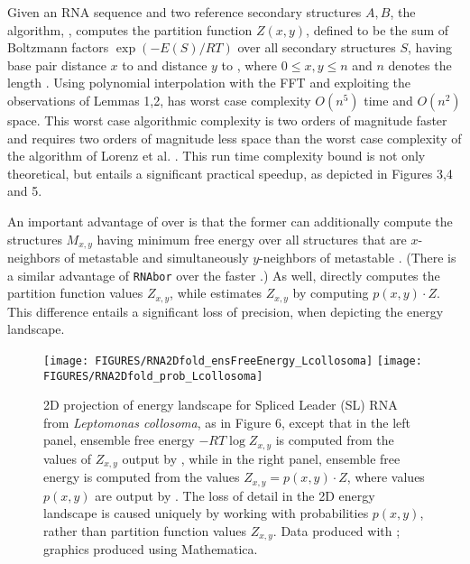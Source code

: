 Given an RNA sequence \seq and two reference secondary structures $A,B$,
the algorithm, \ffttwo, computes the partition
function $Z(x,y)$, defined to be the sum of Boltzmann factors
$\exp(-E(S)/RT)$ over all secondary structures $S$, having base pair
distance $x$ to  \strA and distance $y$ to \strB, where
$0 \leq x,y \leq n$ and $n$ denotes the length \seq.
Using polynomial interpolation with the FFT and exploiting the observations
of Lemmas 1,2, \ffttwo has worst case complexity
$O(n^5)$ time and $O(n^2)$ space. This worst case
algorithmic complexity is two orders of magnitude faster and requires two
orders of magnitude less space than the worst case complexity of the
algorithm \rnatwofold of Lorenz et al. \cite{hofacker:RNAbor2D}.
This run time complexity bound is not only theoretical, but entails
a significant practical speedup, as depicted in
Figures 3,4 and 5.

An important advantage of
\rnatwofold over \ffttwo is that the former can additionally
compute the structures $M_{x,y}$ having minimum free energy over all
structures that are $x$-neighbors of metastable \strA and simultaneously
$y$-neighbors of metastable \strB. (There is a similar advantage of {\tt RNAbor}
\cite{Freyhult.b07} over the faster \fftbor \cite{fftbor}.)
As well, \rnatwofold directly computes the partition function values
$Z_{x,y}$, while \ffttwo estimates $Z_{x,y}$ by computing
$p(x,y) \cdot Z$. This difference entails a significant loss of precision,
when depicting the energy landscape.


\begin{figure}[!t]
\begin{center}
\texttt{[image: FIGURES/RNA2Dfold\_ensFreeEnergy\_Lcollosoma]}
\hskip 1cm
\texttt{[image: FIGURES/RNA2Dfold\_prob\_Lcollosoma]}
\caption{\small
2D projection of energy landscape for Spliced Leader (SL) RNA
from {\em Leptomonas collosoma}, as in
Figure 6,
except that in the left panel, ensemble free energy $-RT \log Z_{x,y}$
is computed from the values of $Z_{x,y}$ output by \rnatwofold,
while in the right panel, ensemble free energy is computed from
the values $Z_{x,y} = p(x,y) \cdot Z$, where values $p(x,y)$ are output
by \rnatwofold.
The loss of detail in the 2D energy landscape is caused uniquely by
working with probabilities $p(x,y)$, rather than partition function
values $Z_{x,y}$.
Data produced with \rnatwofold; graphics produced using Mathematica.
}
\label{fig:heatmapRNA2Dfold}
\end{center}
\end{figure}

